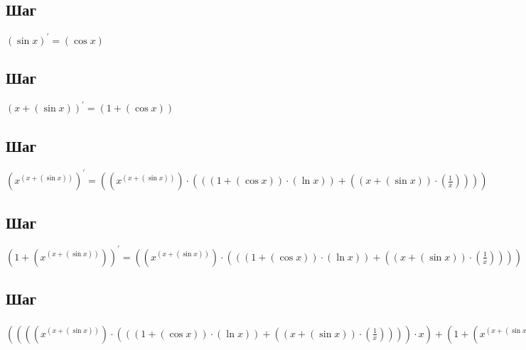 \documentclass[12pt, letterpaper]{article}
\begin{document}
\subsection{Шаг}
\hfil $(\sin{x})^{\prime} = (\cos{x})$

\subsection{Шаг}
\hfil $({x}+{(\sin{x})})^{\prime} = ({1}+{(\cos{x})})$

\subsection{Шаг}
\hfil $({x}^{({x}+{(\sin{x})})})^{\prime} = ({({x}^{({x}+{(\sin{x})})})}\cdot{({({({1}+{(\cos{x})})}\cdot{(\ln{x})})}+{({({x}+{(\sin{x})})}\cdot{(\frac{1}{x})})})})$

\subsection{Шаг}
\hfil $({1}+{({x}^{({x}+{(\sin{x})})})})^{\prime} = ({({x}^{({x}+{(\sin{x})})})}\cdot{({({({1}+{(\cos{x})})}\cdot{(\ln{x})})}+{({({x}+{(\sin{x})})}\cdot{(\frac{1}{x})})})})$

\subsection{Шаг}
\hfil $({({({({x}^{({x}+{(\sin{x})})})}\cdot{({({({1}+{(\cos{x})})}\cdot{(\ln{x})})}+{({({x}+{(\sin{x})})}\cdot{(\frac{1}{x})})})})}\cdot{x})}+{({1}+{({x}^{({x}+{(\sin{x})})})})})^{\prime} = ({({({({({({({x}^{({x}+{(\sin{x})})})}\cdot{({({({1}+{(\cos{x})})}\cdot{(\ln{x})})}+{({({x}+{(\sin{x})})}\cdot{(\frac{1}{x})})})})}\cdot{({({({1}+{(\cos{x})})}\cdot{(\ln{x})})}+{({({x}+{(\sin{x})})}\cdot{(\frac{1}{x})})})})}+{({({x}^{({x}+{(\sin{x})})})}\cdot{({({({({-1}\cdot{(\sin{x})})}\cdot{(\ln{x})})}+{({({1}+{(\cos{x})})}\cdot{(\frac{1}{x})})})}+{({({({1}+{(\cos{x})})}\cdot{(\frac{1}{x})})}+{({({x}+{(\sin{x})})}\cdot{(\frac{-1}{({x}^{2})})})})})})})}\cdot{x})}+{({({x}^{({x}+{(\sin{x})})})}\cdot{({({({1}+{(\cos{x})})}\cdot{(\ln{x})})}+{({({x}+{(\sin{x})})}\cdot{(\frac{1}{x})})})})})}+{({({x}^{({x}+{(\sin{x})})})}\cdot{({({({1}+{(\cos{x})})}\cdot{(\ln{x})})}+{({({x}+{(\sin{x})})}\cdot{(\frac{1}{x})})})})})$

\end{document}
